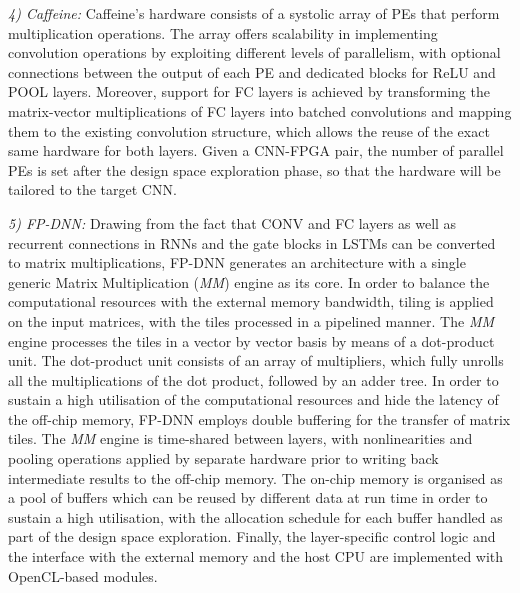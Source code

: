 \documentclass[format=acmsmall, review=false, screen=true]{acmart}
\begin{document}
\textit{4) Caffeine:}
Caffeine's hardware consists of a systolic array of PEs that perform multiplication operations. The array offers scalability in implementing convolution operations by exploiting different levels of parallelism, with optional connections between the output of each PE and dedicated blocks for ReLU and POOL layers. Moreover, support for FC layers is achieved by transforming the matrix-vector multiplications of FC layers into batched convolutions and mapping them to the existing convolution structure, which allows the reuse of the exact same hardware for both layers. Given a CNN-FPGA pair, the number of parallel PEs is set after the design space exploration phase, so that the hardware will be tailored to the target CNN.

\textit{5) FP-DNN:}
Drawing from the fact that CONV and FC layers as well as recurrent connections in RNNs and the gate blocks in LSTMs can be converted to matrix multiplications, FP-DNN generates an architecture with a single generic Matrix Multiplication (\textit{MM}) engine as its core. In order to balance the computational resources with the external memory bandwidth, tiling is applied on the input matrices, with the tiles processed in a pipelined manner. The \textit{MM} engine processes the tiles in a vector by vector basis by means of a dot-product unit. The dot-product unit consists of an array of multipliers, which fully unrolls all the multiplications of the dot product, followed by an adder tree. In order to sustain a high utilisation of the computational resources and hide the latency of the off-chip memory, FP-DNN employs double buffering for the transfer of matrix tiles. The \textit{MM} engine is time-shared between layers, with nonlinearities and pooling operations applied by separate hardware prior to writing back intermediate results to the off-chip memory. The on-chip memory is organised as a pool of buffers which can be reused by different data at run time in order to sustain a high utilisation, with the allocation schedule for each buffer handled as part of the design space exploration. Finally, the layer-specific control logic and the interface with the external memory and the host CPU are implemented with OpenCL-based modules.
\end{document}
